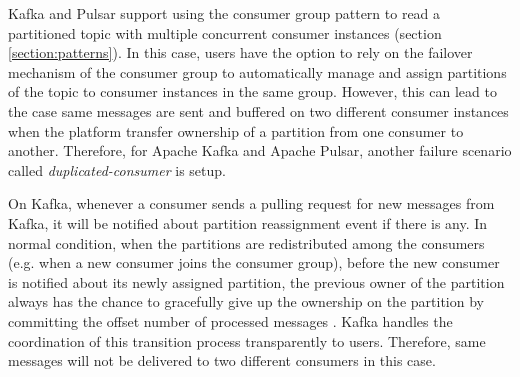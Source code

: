 Kafka and Pulsar support using the consumer group pattern to read a partitioned topic with multiple concurrent consumer instances (section \ref{section:patterns}). In this case, users have the option to rely on the failover mechanism of the consumer group to automatically manage and assign partitions of the topic to consumer instances in the same group. However, this can lead to the case same messages are sent and buffered on two different consumer instances when the platform transfer ownership of a partition from one consumer to another. Therefore, for Apache Kafka and Apache Pulsar, another failure scenario called \emph{duplicated-consumer} is setup.

On Kafka, whenever a consumer sends a pulling request for new messages from Kafka, it will be notified about partition reassignment event if there is any. In normal condition, when the partitions are redistributed among the consumers (e.g. when a new consumer joins the consumer group), before the new consumer is notified about its newly assigned partition, the previous owner of the partition always has the chance to gracefully give up the ownership on the partition by committing the offset number of processed messages \cite{kafkaconsumerimplement}. Kafka handles the coordination of this transition process transparently to users. Therefore, same messages will not be delivered to two different consumers in this case. 

